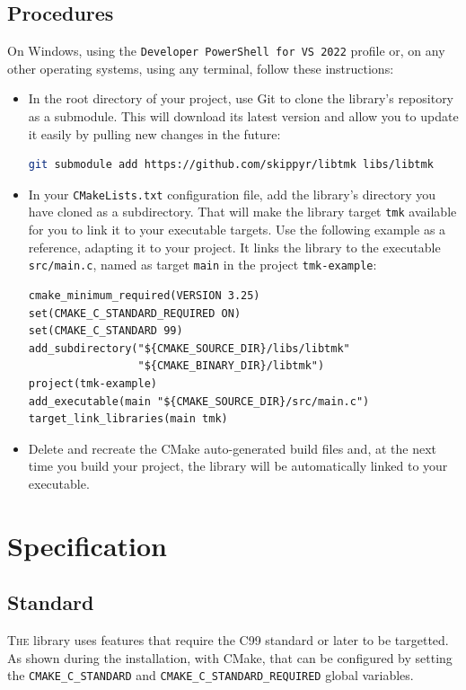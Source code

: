 \documentclass{report}
\newcommand{\flmcap}[2]{\lettrine{\color{flmred}#1}{#2}}
\begin{document}
\section{Procedures}
On Windows, using the \texttt{Developer PowerShell for VS 2022} profile or, on any other operating systems, using any terminal, follow these instructions:
\begin{itemize}
  \item In the root directory of your project, use Git to clone the library's repository as a submodule. This will download its latest version and allow you to update it easily by pulling new changes in the future:
  \begin{lstlisting}[language=sh,caption=a command to clone the library's repository as a submodule.]
git submodule add https://github.com/skippyr/libtmk libs/libtmk
  \end{lstlisting}
  \item In your \texttt{CMakeLists.txt} configuration file, add the library's directory you have cloned as a subdirectory. That will make the library target \texttt{tmk} available for you to link it to your executable targets.
  Use the following example as a reference, adapting it to your project. It links the library to the executable \texttt{src/main.c}, named as target \texttt{main} in the project \texttt{tmk-example}:
  \begin{lstlisting}[caption=a \texttt{CMakeLists.txt} example that links the library to an executable.]
cmake_minimum_required(VERSION 3.25)
set(CMAKE_C_STANDARD_REQUIRED ON)
set(CMAKE_C_STANDARD 99)
add_subdirectory("${CMAKE_SOURCE_DIR}/libs/libtmk"
                 "${CMAKE_BINARY_DIR}/libtmk")
project(tmk-example)
add_executable(main "${CMAKE_SOURCE_DIR}/src/main.c")
target_link_libraries(main tmk)
  \end{lstlisting}
  \item Delete and recreate the CMake auto-generated build files and, at the next time you build your project, the library will be automatically linked to your executable.
\end{itemize}
\chapter{Specification}
\section{Standard}
\flmcap{T}{he} library uses features that require the C99 standard or later to be targetted. As shown during the installation, with CMake, that can be configured by setting the \texttt{CMAKE\_C\_STANDARD} and \texttt{CMAKE\_C\_STANDARD\_REQUIRED} global variables.
\end{document}
